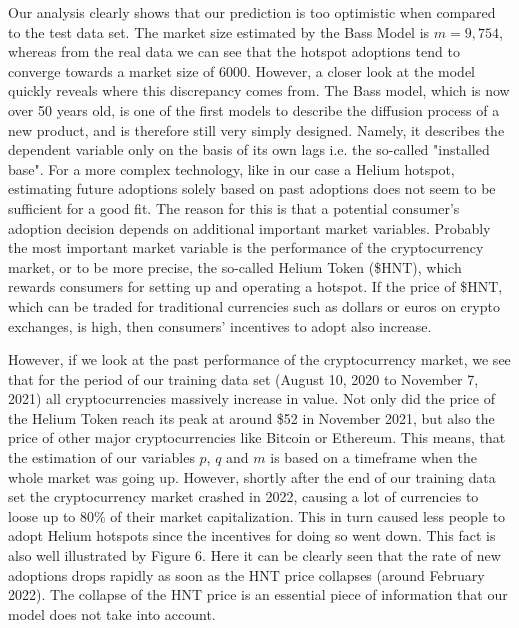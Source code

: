 \documentclass{article}
\begin{document}
Our analysis clearly shows that our prediction is too optimistic when compared to the test data set. The market size estimated by the Bass Model is $m = 9,754$, whereas
from the real data we can see that the hotspot adoptions tend to converge towards a market size of $6000$. However, a closer look at the model quickly reveals where
this discrepancy comes from. The Bass model, which is now over 50 years old, is one of the first models to describe the diffusion process of a new product, and is
therefore still very simply designed. Namely, it describes the dependent variable only on the basis of its own lags i.e. the so-called "installed base". For a more
complex technology, like in our case a Helium hotspot, estimating future adoptions solely based on past adoptions does not seem to be sufficient for a good fit.
The reason for this is that a potential consumer's adoption decision depends on additional important market variables. Probably the most important market variable
is the performance of the cryptocurrency market, or to be more precise, the so-called Helium Token (\$HNT), which rewards consumers for setting up and operating a
hotspot. If the price of \$HNT, which can be traded for traditional currencies such as dollars or euros on crypto exchanges, is high, then consumers'
incentives to adopt also increase. 

\bigskip

\noindent However, if we look at the past performance of the cryptocurrency market, we see that for the period of our training data set (August 10, 2020 to November 7, 2021) all
cryptocurrencies massively increase in value. Not only did the price of the Helium Token reach its peak at around \$52 in November 2021, but also the price of other major
cryptocurrencies like Bitcoin or Ethereum. This means, that the estimation of our variables $p$, $q$ and $m$ is based on a timeframe when the whole market was going up. However,
shortly after the end of our training data set the cryptocurrency market crashed in 2022, causing a lot of currencies to loose up to 80\% of their market capitalization. This in
turn caused less people to adopt Helium hotspots since the incentives for doing so went down. This fact is also well illustrated by Figure 6. Here it can be clearly seen that the
rate of new adoptions drops rapidly as soon as the HNT price collapses (around February 2022). The collapse of the HNT price is an essential piece of information that our model
does not take into account.
\end{document}
